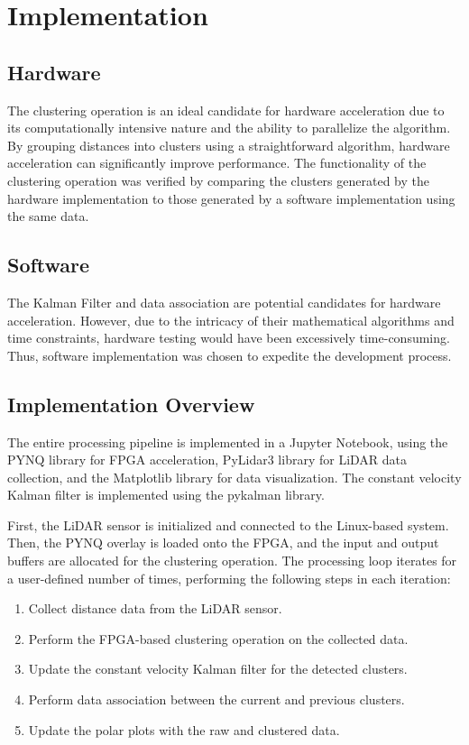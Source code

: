 \documentclass[journal]{IEEEtran} %
\begin{document}
\section{Implementation}

\subsection{Hardware}
The clustering operation is an ideal candidate for hardware acceleration due to its computationally intensive nature and the ability to parallelize the algorithm. By grouping distances into clusters using a straightforward algorithm, hardware acceleration can significantly improve performance. The functionality of the clustering operation was verified by comparing the clusters generated by the hardware implementation to those generated by a software implementation using the same data.

\subsection{Software}
The Kalman Filter and data association are potential candidates for hardware acceleration. However, due to the intricacy of their mathematical algorithms and time constraints, hardware testing would have been excessively time-consuming. Thus, software implementation was chosen to expedite the development process.

\subsection{Implementation Overview}

The entire processing pipeline is implemented in a Jupyter Notebook, using the PYNQ library for FPGA acceleration, PyLidar3 library for LiDAR data collection, and the Matplotlib library for data visualization. The constant velocity Kalman filter is implemented using the pykalman library.

First, the LiDAR sensor is initialized and connected to the Linux-based system. Then, the PYNQ overlay is loaded onto the FPGA, and the input and output buffers are allocated for the clustering operation. The processing loop iterates for a user-defined number of times, performing the following steps in each iteration:

\begin{enumerate}
\item Collect distance data from the LiDAR sensor.
\item Perform the FPGA-based clustering operation on the collected data.
\item Update the constant velocity Kalman filter for the detected clusters.
\item Perform data association between the current and previous clusters.
\item Update the polar plots with the raw and clustered data.
\end{enumerate}
\end{document}
